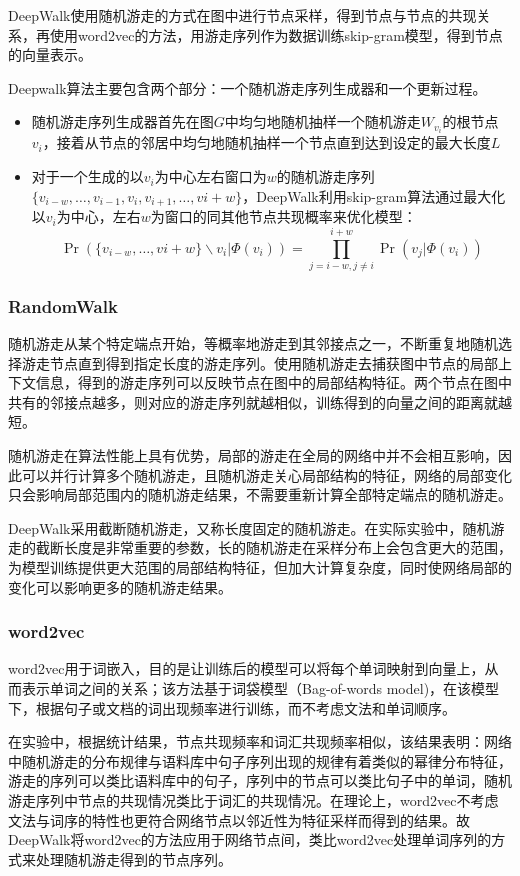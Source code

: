 \documentclass{ctexart}
\begin{document}
DeepWalk使用随机游走的方式在图中进行节点采样，得到节点与节点的共现关系，再使用word2vec的方法，用游走序列作为数据训练skip-gram模型，得到节点的向量表示。

Deepwalk算法主要包含两个部分：一个随机游走序列生成器和一个更新过程。

\begin{itemize}
    \item 随机游走序列生成器首先在图$G$中均匀地随机抽样一个随机游走$W_{v_i}$的根节点 $v_i$，接着从节点的邻居中均匀地随机抽样一个节点直到达到设定的最大长度$L$
    \item 对于一个生成的以$v_i$为中心左右窗口为$w$的随机游走序列$\{v_{i−w},\dots,v_{i−1},v_i,v_{i+1},\dots,v{i+w}\}$，DeepWalk利用skip-gram算法通过最大化以$v_i$为中心，左右$w$为窗口的同其他节点共现概率来优化模型：$$ \Pr(\{v_{i−w},\dots,v{i+w}\}\backslash v_i| \Phi(v_i) ) = \prod_{j=i-w,j\neq i}^{i+w}\Pr(v_j|\Phi(v_i)) $$
\end{itemize}

\subsubsection{RandomWalk}

随机游走从某个特定端点开始，等概率地游走到其邻接点之一，不断重复地随机选择游走节点直到得到指定长度的游走序列。使用随机游走去捕获图中节点的局部上下文信息，得到的游走序列可以反映节点在图中的局部结构特征。两个节点在图中共有的邻接点越多，则对应的游走序列就越相似，训练得到的向量之间的距离就越短。

随机游走在算法性能上具有优势，局部的游走在全局的网络中并不会相互影响，因此可以并行计算多个随机游走，且随机游走关心局部结构的特征，网络的局部变化只会影响局部范围内的随机游走结果，不需要重新计算全部特定端点的随机游走。

DeepWalk采用截断随机游走，又称长度固定的随机游走。在实际实验中，随机游走的截断长度是非常重要的参数，长的随机游走在采样分布上会包含更大的范围，为模型训练提供更大范围的局部结构特征，但加大计算复杂度，同时使网络局部的变化可以影响更多的随机游走结果。

\subsubsection{word2vec}

word2vec用于词嵌入，目的是让训练后的模型可以将每个单词映射到向量上，从而表示单词之间的关系；该方法基于词袋模型（Bag-of-words model)，在该模型下，根据句子或文档的词出现频率进行训练，而不考虑文法和单词顺序。

在实验中，根据统计结果，节点共现频率和词汇共现频率相似，该结果表明：网络中随机游走的分布规律与语料库中句子序列出现的规律有着类似的幂律分布特征，游走的序列可以类比语料库中的句子，序列中的节点可以类比句子中的单词，随机游走序列中节点的共现情况类比于词汇的共现情况。在理论上，word2vec不考虑文法与词序的特性也更符合网络节点以邻近性为特征采样而得到的结果。故DeepWalk将word2vec的方法应用于网络节点间，类比word2vec处理单词序列的方式来处理随机游走得到的节点序列。
\end{document}
